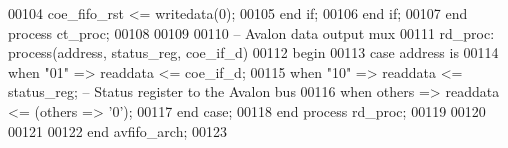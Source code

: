 \begin{DoxyCode}
00104                 \textcolor{vhdlchar}{coe_fifo_rst} \textcolor{vhdlchar}{<=} \textcolor{vhdlchar}{writedata}\textcolor{vhdlchar}{(}\textcolor{vhdllogic}{}\textcolor{vhdllogic}{0}\textcolor{vhdlchar}{)};
00105             \textcolor{keywordflow}{end} \textcolor{keywordflow}{if};
00106         \textcolor{keywordflow}{end} \textcolor{keywordflow}{if};
00107     \textcolor{keywordflow}{end} \textcolor{keywordflow}{process} \textcolor{vhdlchar}{ct\_proc};    
00108     
00109 
00110 \textcolor{keyword}{    -- Avalon data output mux}
00111     rd\_proc: \textcolor{keywordflow}{process}(address, status_reg, coe_if_d) 
00112 \textcolor{vhdlkeyword}{    begin}
00113         \textcolor{keywordflow}{case} \textcolor{vhdlchar}{address} \textcolor{keywordflow}{is}
00114             \textcolor{keywordflow}{when} \textcolor{vhdllogic}{"01"} \textcolor{vhdlchar}{=}\textcolor{vhdlchar}{>} \textcolor{vhdlchar}{readdata} \textcolor{vhdlchar}{<=} \textcolor{vhdlchar}{coe_if_d};
00115             \textcolor{keywordflow}{when} \textcolor{vhdllogic}{"10"} \textcolor{vhdlchar}{=}\textcolor{vhdlchar}{>} \textcolor{vhdlchar}{readdata} \textcolor{vhdlchar}{<=} \textcolor{vhdlchar}{status_reg};\textcolor{keyword}{        -- Status register to the Avalon bus}
00116             \textcolor{keywordflow}{when} \textcolor{keywordflow}{others} \textcolor{vhdlchar}{=}\textcolor{vhdlchar}{>} \textcolor{vhdlchar}{readdata} \textcolor{vhdlchar}{<=} \textcolor{vhdlchar}{(}\textcolor{keywordflow}{others} \textcolor{vhdlchar}{=}\textcolor{vhdlchar}{>} \textcolor{vhdlchar}{'}\textcolor{vhdllogic}{}\textcolor{vhdllogic}{0}\textcolor{vhdlchar}{'}\textcolor{vhdlchar}{)};         
00117         \textcolor{keywordflow}{end} \textcolor{keywordflow}{case};
00118     \textcolor{keywordflow}{end} \textcolor{keywordflow}{process} \textcolor{vhdlchar}{rd\_proc};
00119 
00120 
00121 
00122 \textcolor{keywordflow}{end} \textcolor{vhdlchar}{avfifo\_arch};
00123 
\end{DoxyCode}
